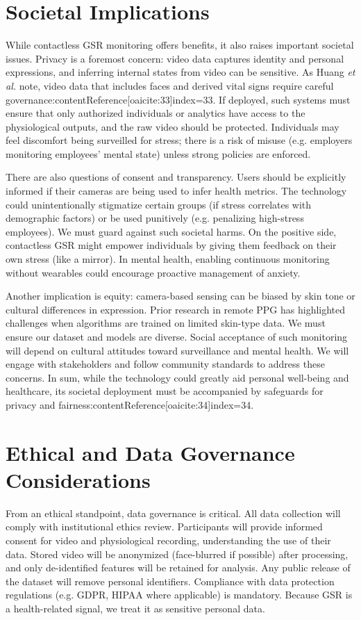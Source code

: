 \documentclass[12pt]{article}
\begin{document}
    \section{Societal Implications}
    While contactless GSR monitoring offers benefits, it also raises important societal issues. Privacy is a foremost concern: video data captures identity and personal expressions, and inferring internal states from video can be sensitive. As Huang \emph{et al.} note, video data that includes faces and derived vital signs require careful governance:contentReference[oaicite:33]{index=33}. If deployed, such systems must ensure that only authorized individuals or analytics have access to the physiological outputs, and the raw video should be protected. Individuals may feel discomfort being surveilled for stress; there is a risk of misuse (e.g. employers monitoring employees’ mental state) unless strong policies are enforced.

    There are also questions of consent and transparency. Users should be explicitly informed if their cameras are being used to infer health metrics. The technology could unintentionally stigmatize certain groups (if stress correlates with demographic factors) or be used punitively (e.g. penalizing high-stress employees). We must guard against such societal harms. On the positive side, contactless GSR might empower individuals by giving them feedback on their own stress (like a mirror). In mental health, enabling continuous monitoring without wearables could encourage proactive management of anxiety.

    Another implication is equity: camera-based sensing can be biased by skin tone or cultural differences in expression. Prior research in remote PPG has highlighted challenges when algorithms are trained on limited skin-type data. We must ensure our dataset and models are diverse. Social acceptance of such monitoring will depend on cultural attitudes toward surveillance and mental health. We will engage with stakeholders and follow community standards to address these concerns. In sum, while the technology could greatly aid personal well-being and healthcare, its societal deployment must be accompanied by safeguards for privacy and fairness:contentReference[oaicite:34]{index=34}.


    \section{Ethical and Data Governance Considerations}
    From an ethical standpoint, data governance is critical. All data collection will comply with institutional ethics review. Participants will provide informed consent for video and physiological recording, understanding the use of their data. Stored video will be anonymized (face-blurred if possible) after processing, and only de-identified features will be retained for analysis. Any public release of the dataset will remove personal identifiers. Compliance with data protection regulations (e.g. GDPR, HIPAA where applicable) is mandatory. Because GSR is a health-related signal, we treat it as sensitive personal data.
\end{document}
